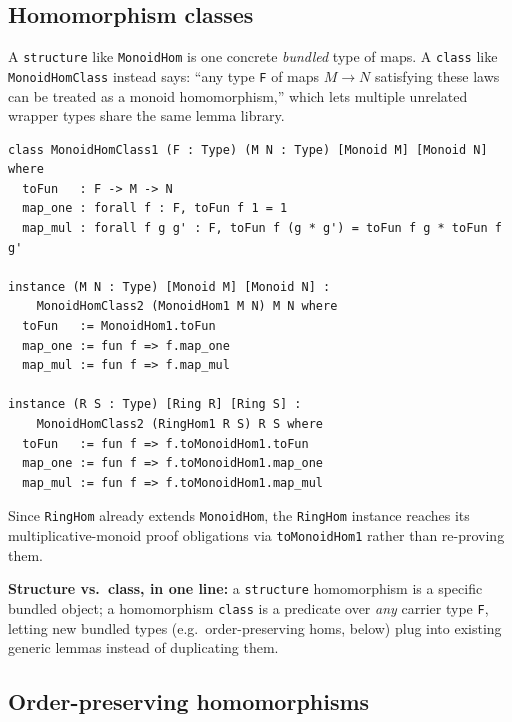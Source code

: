 \documentclass[11pt]{article}
\begin{document}
\subsection{Homomorphism classes}

A \texttt{structure} like \texttt{MonoidHom} is one concrete \emph{bundled} type of maps. A \texttt{class} like \texttt{MonoidHomClass} instead says: ``any type \texttt{F} of maps $M \to N$ satisfying these laws can be treated as a monoid homomorphism,'' which lets multiple unrelated wrapper types share the same lemma library.

\begin{lstlisting}
class MonoidHomClass1 (F : Type) (M N : Type) [Monoid M] [Monoid N] where
  toFun   : F -> M -> N
  map_one : forall f : F, toFun f 1 = 1
  map_mul : forall f g g' : F, toFun f (g * g') = toFun f g * toFun f g'

instance (M N : Type) [Monoid M] [Monoid N] :
    MonoidHomClass2 (MonoidHom1 M N) M N where
  toFun   := MonoidHom1.toFun
  map_one := fun f => f.map_one
  map_mul := fun f => f.map_mul

instance (R S : Type) [Ring R] [Ring S] :
    MonoidHomClass2 (RingHom1 R S) R S where
  toFun   := fun f => f.toMonoidHom1.toFun
  map_one := fun f => f.toMonoidHom1.map_one
  map_mul := fun f => f.toMonoidHom1.map_mul
\end{lstlisting}

Since \texttt{RingHom} already extends \texttt{MonoidHom}, the \texttt{RingHom} instance reaches its multiplicative-monoid proof obligations via \texttt{toMonoidHom1} rather than re-proving them.

\begin{takeaway}
\textbf{Structure vs.\ class, in one line:} a \texttt{structure} homomorphism is a specific bundled object; a homomorphism \texttt{class} is a predicate over \emph{any} carrier type \texttt{F}, letting new bundled types (e.g.\ order-preserving homs, below) plug into existing generic lemmas instead of duplicating them.
\end{takeaway}

\subsection{Order-preserving homomorphisms}
\end{document}
